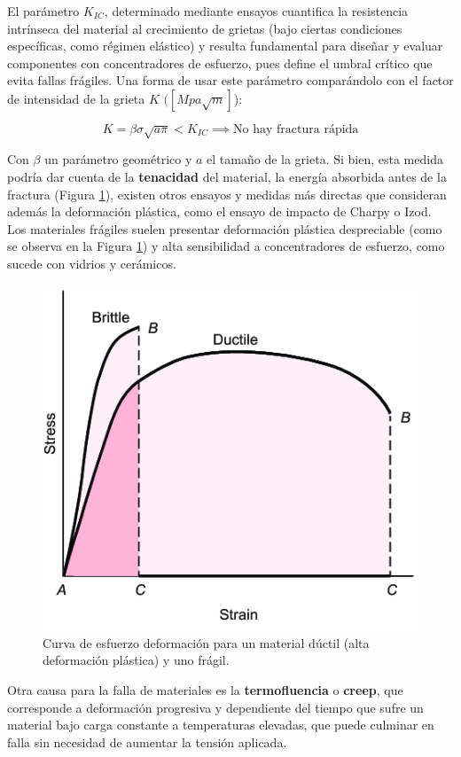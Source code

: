 El parámetro $K_{IC}$, determinado mediante ensayos cuantifica la resistencia intrínseca del material al crecimiento de grietas (bajo ciertas condiciones específicas, como régimen elástico) y resulta fundamental para diseñar y evaluar componentes con concentradores de esfuerzo, pues define el umbral crítico que evita fallas frágiles. Una forma de usar este parámetro comparándolo con el factor de intensidad de la grieta $K$ $([Mpa\sqrt{m}]$): 

\begin{equation}
    K=\beta \sigma\sqrt{a\pi} < K_{IC} \implies \text{No hay fractura rápida}
\end{equation}

Con $\beta$ un parámetro geométrico y $a$ el tamaño de la grieta. Si bien, esta medida podría dar cuenta de la \textbf{tenacidad} del material, la energía absorbida antes de la fractura (Figura \ref{fig:5}), existen otros ensayos y medidas más directas que consideran además la deformación plástica, como el ensayo de impacto de Charpy o Izod. Los materiales frágiles suelen presentar deformación plástica despreciable (como se observa en la Figura \ref{fig:5}) y alta sensibilidad a concentradores de esfuerzo, como sucede con vidrios y cerámicos.

\begin{figure}[h!]
    \centering
    \includegraphics[width=0.55\linewidth]{imgs/tough.png}
    \caption{Curva de esfuerzo deformación para un material dúctil (alta deformación plástica) y uno frágil.}
    \label{fig:5}
\end{figure}

Otra causa para la falla de materiales es la \textbf{termofluencia} o \textbf{creep}, que corresponde a deformación progresiva y dependiente del tiempo que sufre un material bajo carga constante a temperaturas elevadas, que puede culminar en falla sin necesidad de aumentar la tensión aplicada. 

